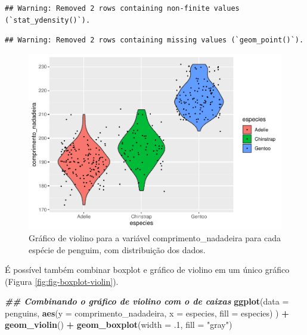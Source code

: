 \documentclass[
]{article}
\newenvironment{Shaded}{\begin{snugshade}}{\end{snugshade}}
\newcommand{\AttributeTok}[1]{\textcolor[rgb]{0.13,0.29,0.53}{#1}}
\newcommand{\DecValTok}[1]{\textcolor[rgb]{0.00,0.00,0.81}{#1}}
\newcommand{\DocumentationTok}[1]{\textcolor[rgb]{0.56,0.35,0.01}{\textbf{\textit{#1}}}}
\newcommand{\FunctionTok}[1]{\textcolor[rgb]{0.13,0.29,0.53}{\textbf{#1}}}
\newcommand{\NormalTok}[1]{#1}
\newcommand{\SpecialCharTok}[1]{\textcolor[rgb]{0.81,0.36,0.00}{\textbf{#1}}}
\newcommand{\StringTok}[1]{\textcolor[rgb]{0.31,0.60,0.02}{#1}}
\begin{document}
\begin{verbatim}
## Warning: Removed 2 rows containing non-finite values (`stat_ydensity()`).
\end{verbatim}

\begin{verbatim}
## Warning: Removed 2 rows containing missing values (`geom_point()`).
\end{verbatim}

\begin{figure}
\centering
\includegraphics{epr_files/figure-latex/fig-violin-1.pdf}
\caption{\label{fig:fig-violin}Gráfico de violino para a variável comprimento\_nadadeira para cada espécie de penguim, com distribuição dos dados.}
\end{figure}

É possível também combinar boxplot e gráfico de violino em um único gráfico (Figura \ref{fig:fig-boxplot-violin}).

\begin{Shaded}
\begin{Highlighting}[]
\DocumentationTok{\#\# Combinando o gráfico de violino com o de caixas}
\FunctionTok{ggplot}\NormalTok{(}\AttributeTok{data =}\NormalTok{ penguins, }
       \FunctionTok{aes}\NormalTok{(}\AttributeTok{y =}\NormalTok{ comprimento\_nadadeira, }\AttributeTok{x =}\NormalTok{ especies, }\AttributeTok{fill =}\NormalTok{ especies)}
\NormalTok{       ) }\SpecialCharTok{+}
    \FunctionTok{geom\_violin}\NormalTok{() }\SpecialCharTok{+}
    \FunctionTok{geom\_boxplot}\NormalTok{(}\AttributeTok{width =}\NormalTok{ .}\DecValTok{1}\NormalTok{, }\AttributeTok{fill =} \StringTok{"gray"}\NormalTok{)}
\end{Highlighting}
\end{Shaded}
\end{document}
